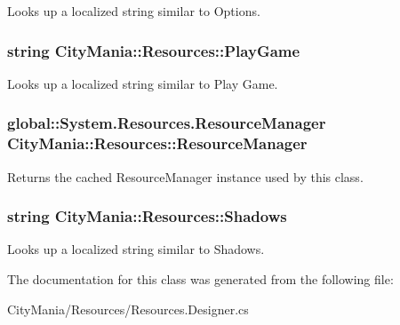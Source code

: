 Looks up a localized string similar to Options. \hypertarget{classCityMania_1_1Resources_a8dff89b9eefe51a5fe443afc53bcaea7}{
\subsubsection[{PlayGame}]{\setlength{\rightskip}{0pt plus 5cm}string CityMania::Resources::PlayGame}}
\label{classCityMania_1_1Resources_a8dff89b9eefe51a5fe443afc53bcaea7}


Looks up a localized string similar to Play Game. \hypertarget{classCityMania_1_1Resources_a3d06ecff941444976e30fb5e31938ad1}{
\subsubsection[{ResourceManager}]{\setlength{\rightskip}{0pt plus 5cm}global::System.Resources.ResourceManager CityMania::Resources::ResourceManager}}
\label{classCityMania_1_1Resources_a3d06ecff941444976e30fb5e31938ad1}


Returns the cached ResourceManager instance used by this class. \hypertarget{classCityMania_1_1Resources_af42bfbda6e4ab38576291744fbe8ec71}{
\subsubsection[{Shadows}]{\setlength{\rightskip}{0pt plus 5cm}string CityMania::Resources::Shadows}}
\label{classCityMania_1_1Resources_af42bfbda6e4ab38576291744fbe8ec71}


Looks up a localized string similar to Shadows. 

The documentation for this class was generated from the following file:\begin{DoxyCompactItemize}
\item 
CityMania/Resources/Resources.Designer.cs\end{DoxyCompactItemize}
